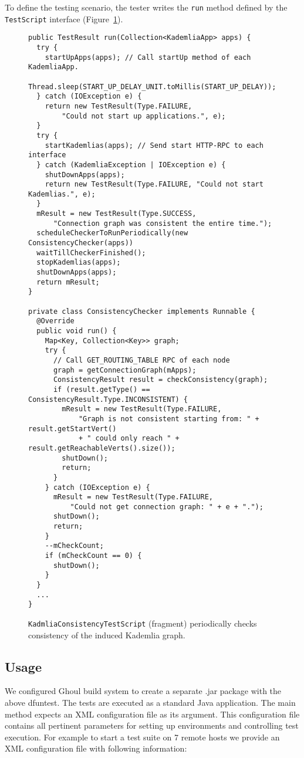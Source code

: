 To define the testing scenario, the tester writes the \texttt{run} method defined by the
\texttt{TestScript} interface (Figure~\ref{fig:core}).

\begin{figure}[tbp]
\begin{lstlisting}
public TestResult run(Collection<KademliaApp> apps) {
  try {
    startUpApps(apps); // Call startUp method of each KademliaApp.
    Thread.sleep(START_UP_DELAY_UNIT.toMillis(START_UP_DELAY));
  } catch (IOException e) {
    return new TestResult(Type.FAILURE,
        "Could not start up applications.", e);
  }
  try {
    startKademlias(apps); // Send start HTTP-RPC to each interface
  } catch (KademliaException | IOException e) {
    shutDownApps(apps);
    return new TestResult(Type.FAILURE, "Could not start Kademlias.", e);
  }
  mResult = new TestResult(Type.SUCCESS,
      "Connection graph was consistent the entire time.");
  scheduleCheckerToRunPeriodically(new ConsistencyChecker(apps))
  waitTillCheckerFinished();
  stopKademlias(apps);
  shutDownApps(apps);
  return mResult;
}

private class ConsistencyChecker implements Runnable {
  @Override
  public void run() {
    Map<Key, Collection<Key>> graph;
    try {
      // Call GET_ROUTING_TABLE RPC of each node
      graph = getConnectionGraph(mApps);
      ConsistencyResult result = checkConsistency(graph);
      if (result.getType() == ConsistencyResult.Type.INCONSISTENT) {
        mResult = new TestResult(Type.FAILURE,
            "Graph is not consistent starting from: " + result.getStartVert()
            + " could only reach " + result.getReachableVerts().size());
        shutDown();
        return;
      }
    } catch (IOException e) {
      mResult = new TestResult(Type.FAILURE,
          "Could not get connection graph: " + e + ".");
      shutDown();
      return;
    }
    --mCheckCount;
    if (mCheckCount == 0) {
      shutDown();
    }
  }
  ...
}
\end{lstlisting}
\caption{\texttt{KadmliaConsistencyTestScript} (fragment) periodically checks consistency of the induced Kademlia graph.}
\label{fig:core}
\end{figure}

\subsection{Usage}

We configured Ghoul build system to create a separate .jar package with the above dfuntest.
The tests are executed as a standard Java application.
The main method expects an XML configuration file as its argument.
This configuration file contains all pertinent parameters for setting up
environments and controlling test execution. For example to start a test suite on
7 remote hosts we provide an XML configuration file with following information:

